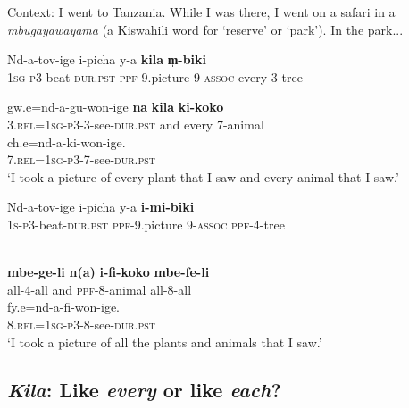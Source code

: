 \documentclass[output=paper,modfonts,nonflat]{langsci/langscibook}
\begin{document}
\begin{exe}

\ex Context: I went to Tanzania. While I was there, I went on a safari in a \textit{mbugayawayama} (a Kiswahili word for `reserve' or `park'). In the park... \label{ex:kaspercushman:photos}\\

\begin{xlist}

\ex 
\gll Nd-a-tov-ige i-picha y-a \textbf{kila} \textbf{m̩-biki} \\
\textsc{1sg}-\textsc{p3}-beat-\textsc{dur.pst} \textsc{ppf}-9.picture 9-\textsc{assoc} every 3-tree \\ \label{ex:kaspercushman:everyphotos}


\gll gw.e=nd-a-gu-won-ige \textbf{na} \textbf{kila} \textbf{ki-koko} \\
3.\textsc{rel}=\textsc{1sg}-\textsc{p3}-3-see-\textsc{dur.pst} and every 7-animal \\


\gll ch.e=nd-a-ki-won-ige. \\
  7.\textsc{rel}=\textsc{1sg}-\textsc{p3}-7-see-\textsc{dur.pst}  \\
  
\glt `I took a picture of every plant that I saw and every animal that I saw.' 



\ex 
\gll Nd-a-tov-ige i-picha y-a \textbf{i-mi-biki}  \\ 
\textsc{1s}-\textsc{p3}-beat-\textsc{dur.pst} \textsc{ppf}-9.picture 9-\textsc{assoc} \textsc{ppf}-4-tree \\ \


\gll \textbf{mbe-ge-li} \textbf{n(a)} \textbf{i-fi-koko} \textbf{mbe-fe-li} \label{ex:kaspercushman:allphotos} \\
 all-4-all and \textsc{ppf}-8-animal all-8-all  \\
 
 
\gll fy.e=nd-a-fi-won-ige. \\
 8.\textsc{rel}=\textsc{1sg}-\textsc{p3}-8-see-\textsc{dur.pst} \\
 
\glt `I took a picture of all the plants and animals that I saw.'

\end{xlist}
\end{exe}


\subsection{\emph{Kila}: Like \emph{every} or like \emph{each}?}  
\end{document}
